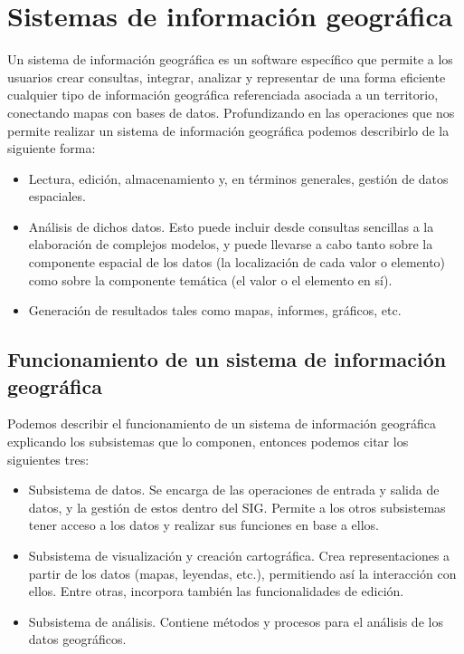 \section{Sistemas de información geográfica}

Un sistema de información geográfica es un software específico que permite a los usuarios crear consultas, integrar, analizar y representar de una forma eficiente cualquier tipo de información geográfica referenciada asociada a un territorio, conectando mapas con bases de datos. \cite{SIG}
Profundizando en las operaciones que nos permite realizar un sistema de información geográfica podemos describirlo de la siguiente forma:


\begin{itemize}
  \item  Lectura, edición, almacenamiento y, en términos generales, gestión de datos espaciales.
  \item  Análisis de dichos datos. Esto puede incluir desde consultas sencillas a la elaboración de complejos modelos, y puede llevarse a cabo tanto sobre la componente espacial de los datos (la localización de cada valor o elemento) como sobre la componente temática (el valor o el elemento en sí).
  \item Generación de resultados tales como mapas, informes, gráficos, etc.
\end{itemize}

\subsection{Funcionamiento de un sistema de información geográfica}
Podemos describir el funcionamiento de un sistema de información geográfica explicando los subsistemas que lo componen, entonces podemos citar los siguientes tres\cite{Func_SIG}:  

\begin{itemize}
  \item  Subsistema de datos. Se encarga de las operaciones de entrada y salida de datos, y la gestión de estos dentro del SIG. Permite a los otros subsistemas tener acceso a los datos y realizar sus funciones en base a ellos.
  \item  Subsistema de visualización y creación cartográfica. Crea representaciones a partir de los datos (mapas, leyendas, etc.), permitiendo así la interacción con ellos. Entre otras, incorpora también las funcionalidades de edición.
  \item Subsistema de análisis. Contiene métodos y procesos para el análisis de los datos geográficos.
\end{itemize}

